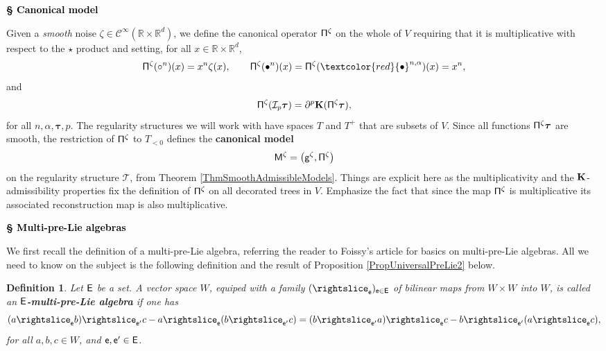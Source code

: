 \documentclass[10pt, reqno]{amsart}
\numberwithin{subsection}{section}
\numberwithin{subsubsection}{subsection}
\numberwithin{equation}{section} %
\theoremstyle{mystyle}
\theoremstyle{mystyle2}
\newtheorem*{defn*} {Definition}
\theoremstyle{mystyle3}
\newcommand{\bstau}{\boldsymbol{\tau}}
\newcommand\bbR{\mathbb{R}}
\newcommand{\mcC}{\mathcal{C}}
\newcommand{\mcI}{\mathcal{I}}
\begin{document}
\bigskip


\hfill \textcolor{black}{\textsf{\textbf{ {\Large \S} Canonical model}}}

\medskip

Given a {\it smooth} noise $\zeta\in\mcC^\infty(\bbR\times\bbR^d)$, we define the canonical operator ${\sf \Pi}^\zeta$ on the whole of $V$ requiring that it is multiplicative with respect to the $\star$ product and setting, for all $x\in\bbR\times\bbR^d$,
$$
{\sf \Pi}^\zeta(\circ^n)(x) = x^n\zeta(x), 
\qquad {\sf \Pi}^\zeta(\bullet^n)(x) =
{\sf \Pi}^\zeta(\textcolor{red}{\bullet}^{n,\alpha})(x)  = x^n,
$$
and 
$$
{\sf \Pi}^\zeta(\mcI_p\bstau) = \partial^p{\bf K}({\sf \Pi}^\zeta\bstau),
$$
for all $n,\alpha, \bstau, p$. The regularity structures we will work with have spaces $T$ and $T^+$ that are subsets of $V$. Since all functions ${\sf\Pi}^\zeta\bstau$ are smooth, the restriction of ${\sf\Pi}^\zeta$ to 
$T_{<0}$ defines the \textbf{\textsf{canonical model}}
$$
{\sf M}^\zeta = \sf \big(g^\zeta,{\Pi}^\zeta\big)
$$ 
on the regularity structure $\mathscr{T}$, from Theorem \ref{ThmSmoothAdmissibleModels}. Things are explicit here as the multiplicativity and the $\bf K$-admissibility properties fix the definition of ${\sf \Pi}^\zeta$ on all decorated trees in $V$. Emphasize the fact that since the map ${\sf \Pi}^\zeta$ is multiplicative its associated reconstruction map is also 
multiplicative.    


\bigskip


\hfill \textcolor{black}{\textsf{\textbf{ {\Large \S} Multi-pre-Lie algebras}}}

\medskip

We first recall the definition of a multi-pre-Lie algebra, referring the reader to Foissy's article \cite{FoissyTypedTrees} for basics on multi-pre-Lie algebras. All we need to know on the subject is the following definition and the result of Proposition \ref{PropUniversalPreLie2} below. 
 
\medskip

\begin{defn*}
Let $\sf{E}$ be a set.
A vector space $W$, equiped with a family $(\rightslice_{\sf {e}})_{\sf{e}\in\sf{E}}$ of bilinear maps from $W\times W$ into $W$, is called an \textbf{\textsf{$\sf{E}$-multi-pre-Lie algebra}} if one has
$$
(a\rightslice_{\sf{e}}b)\rightslice_{\sf{e}'}c - a\rightslice_{\sf{e}}(b\rightslice_{\sf{e}'}c)  = (b\rightslice_{\sf{e}'}a)\rightslice_{\sf{e}}c - b\rightslice_{\sf{e}'}(a\rightslice_{\sf{e}}c),
$$
for all $a,b,c\in W$, and $\sf{e}, \sf{e}'\in\sf{E}$.
\end{defn*}
\end{document}
